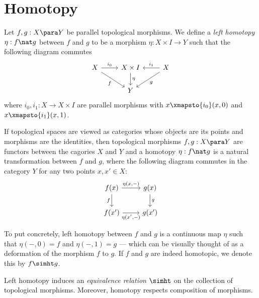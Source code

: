 \section{Homotopy}

\begin{definition}
\label{def:left-homotopy-Top}
Let \(f, g: X \para Y\) be parallel topological morphisms. We define a
\emph{left homotopy} \(\eta: f \nat g\) between \(f\) and \(g\) to be a morphism
\(\eta: X \times I \to Y\) such that the following diagram commutes
\[
\begin{tikzcd}
X \ar[d, rd, "f"'] \ar[r, "i_0"]
& X \times I \ar[d, "\eta"]
& X \ar[l, "i_1"'] \ar[ld, "g"]
\\
& Y
\end{tikzcd}
\]
where \(i_0, i_1: X \to X \times I\) are parallel morphisms with \(x
\xmapsto{i_{0}} (x, 0)\) and \(x \xmapsto{i_{1}} (x, 1)\).

If topological spaces are viewed as categories whose objects are its points and
morphisms are the identities, then topological morphisms \(f, g: X \para Y\) are
functors between the cagories \(X\) and \(Y\) and a homotopy \(\eta: f \nat g\)
is a natural transformation between \(f\) and \(g\), where the following diagram
commutes in the category \(Y\) for any two points \(x, x' \in X\):
\[
\begin{tikzcd}
{f(x)}  \ar[r, "{\eta(x, -)}"] \ar[d, "f"'] &{g(x)} \ar[d, "g"] \\
{f(x')} \ar[r, "\eta{(x', -)}"'] &{g(x')}
\end{tikzcd}
\]
\end{definition}

To put concretely, left homotopy between \(f\) and \(g\) is a continuous map
\(\eta\) such that \(\eta(-, 0) = f\) and \(\eta(-, 1) = g\) --- which can be
visually thought of as a deformation of the morphism \(f\) to \(g\). If \(f\)
and \(g\) are indeed homotopic, we denote this by \(f \simht g\).

\begin{corollary}
\label{cor:htpy-equivalence-rel}
Left homotopy induces an \emph{equivalence relation} \(\simht\) on the
collection of topological morphisms. Moreover, homotopy respects composition of
morphisms.
\end{corollary}

